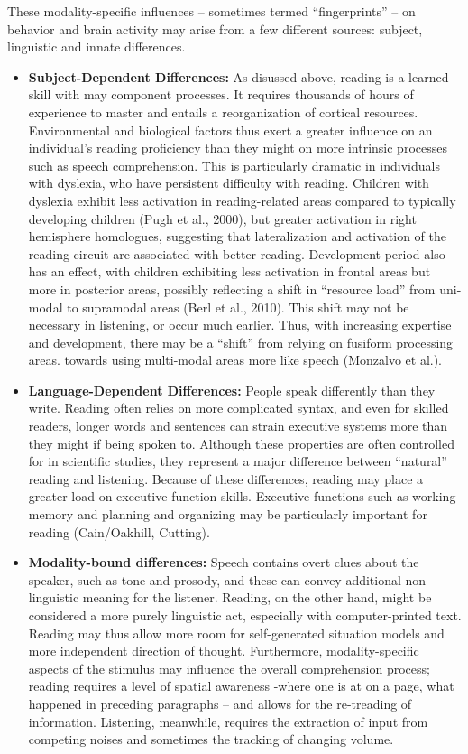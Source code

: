 These modality-specific influences – sometimes termed “fingerprints” – on behavior and brain activity may arise from a few different sources: subject, linguistic and innate differences. 

\begin{itemize}
	\item \textbf{Subject-Dependent Differences:} As disussed above, reading is a learned skill with may component processes. It requires thousands of hours of experience to master and entails a reorganization of cortical resources. Environmental and biological factors thus exert a greater influence on an individual’s reading proficiency than they might on more intrinsic processes such as speech comprehension. This is particularly dramatic in individuals with dyslexia, who have persistent difficulty with reading. Children with dyslexia exhibit less activation in reading-related areas compared to typically developing children (Pugh et al., 2000), but greater activation in right hemisphere homologues, suggesting that lateralization and activation of the reading circuit are associated with better reading. Development period also has an effect, with children exhibiting less activation in frontal areas but more in posterior areas, possibly reflecting a shift in “resource load” from uni-modal to supramodal areas (Berl et al., 2010). This shift may not be necessary in listening, or occur much earlier. Thus, with increasing expertise and development, there may be a “shift” from relying on fusiform processing areas. towards using multi-modal areas more like speech (Monzalvo et al.). 

	\item \textbf{Language-Dependent Differences:} People speak differently than they write. Reading often relies on more complicated syntax, and even for skilled readers, longer words and sentences can strain executive systems more than they might if being spoken to. Although these properties are often controlled for in scientific studies, they represent a major difference between “natural” reading and listening. Because of these differences, reading may place a greater load on executive function skills. Executive functions such as working memory and planning and organizing may be particularly important for reading (Cain/Oakhill, Cutting).  
	
	\item \textbf{Modality-bound differences:} Speech contains overt clues about the speaker, such as tone and prosody, and these can convey additional non-linguistic meaning for the listener. Reading, on the other hand, might be considered a more purely linguistic act, especially with computer-printed text. Reading may thus allow more room for self-generated situation models and more independent direction of thought. Furthermore, modality-specific aspects of the stimulus may influence the overall comprehension process; reading requires a level of spatial awareness -where one is at on a page, what happened in preceding paragraphs – and allows for the re-treading of information. Listening, meanwhile, requires the extraction of input from competing noises and sometimes the tracking of changing volume. 
\end{itemize}

